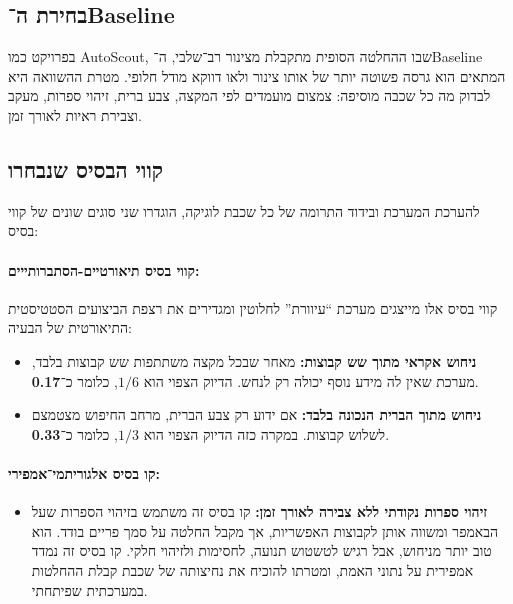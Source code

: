 \subsection{בחירת ה־\textenglish{Baseline}}

בפרויקט כמו \textenglish{AutoScout}, שבו ההחלטה הסופית מתקבלת מצינור
רב־שלבי, ה־\textenglish{Baseline} המתאים הוא גרסה פשוטה יותר של אותו
צינור ולאו דווקא מודל חלופי. מטרת ההשוואה היא לבדוק מה כל שכבה מוסיפה:
צמצום מועמדים לפי המקצה, צבע ברית, זיהוי ספרות, מעקב וצבירת ראיות
לאורך זמן.

\subsection{קווי הבסיס שנבחרו}

להערכת המערכת ובידוד התרומה של כל שכבת לוגיקה, הוגדרו שני סוגים שונים
של קווי בסיס:

\paragraph{קווי בסיס תיאורטיים-הסתברותייים:}
קווי בסיס אלו מייצגים מערכת ``עיוורת'' לחלוטין ומגדירים את רצפת
הביצועים הסטטיסטית התיאורטית של הבעיה:

\begin{itemize}
\item \textbf{ניחוש אקראי מתוך שש קבוצות:} מאחר שבכל מקצה משתתפות שש
  קבוצות בלבד, מערכת שאין לה מידע נוסף יכולה רק לנחש. הדיוק הצפוי הוא
  \textbf{\(1/6\)}, כלומר כ־\textbf{0.17}.
  
\item \textbf{ניחוש מתוך הברית הנכונה בלבד:} אם ידוע רק צבע הברית,
  מרחב החיפוש מצטמצם לשלוש קבוצות. במקרה כזה הדיוק הצפוי הוא
  \textbf{\(1/3\)}, כלומר כ־\textbf{0.33}.
\end{itemize}

\paragraph{קו בסיס אלגוריתמי־אמפירי:}

\begin{itemize}
\item \textbf{זיהוי ספרות נקודתי ללא צבירה לאורך זמן:} קו בסיס זה
  משתמש בזיהוי הספרות שעל הבאמפר ומשווה אותן לקבוצות האפשריות, אך מקבל
  החלטה על סמך פריים בודד. הוא טוב יותר מניחוש, אבל רגיש לטשטוש תנועה,
  לחסימות ולזיהוי חלקי. קו בסיס זה נמדד אמפירית על נתוני האמת, ומטרתו
  להוכיח את נחיצותה של שכבת קבלת ההחלטות במערכתית שפיתחתי.
\end{itemize}

